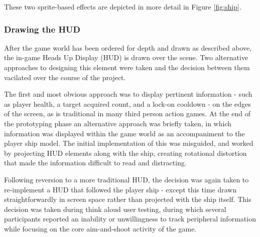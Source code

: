 \documentclass[11pt]{article}
\begin{document}
These two sprite-based effects are depicted in more detail in Figure \ref{fig:ship}.





\subsubsection*{Drawing the HUD}

After the game world has been ordered for depth and drawn as described above, the in-game Heads Up
Display (HUD) is drawn over the scene. Two alternative approaches to designing this element were
taken and the decision between them vacilated over the course of the project.

The first and most obvious approach was to display pertinent information - such as player health,
a target acquired count, and a lock-on cooldown - on the edges of the screen, as is traditional in
many third person action games. At the end of the prototyping phase an alternative approach was
briefly taken, in which information was displayed within the game world as an accompaniment to
the player ship model. The initial implementation of this was misguided, and worked by projecting
HUD elements along with the ship, creating rotational distortion that made the information difficult
to read and distracting.

Following reversion to a more traditional HUD, the decision was again taken to re-implement a
HUD that followed the player ship - except this time drawn straightforwardly in screen space
rather than projected with the ship itself. This decision was taken during think aloud user testing,
during which several participants reported an inability or unwillingness to track peripheral
information while focusing on the core aim-and-shoot activity of the game.
\end{document}
